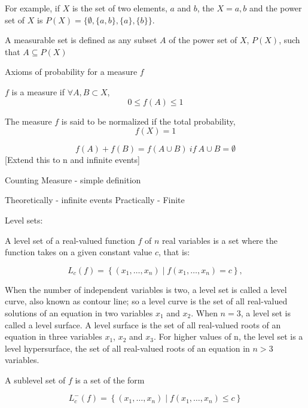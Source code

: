 \documentclass[12pt]{article} %
\theoremstyle{plain}
\begin{document}
	For example, if $X$ is the set of two elements, $a$ and $b$, the $X={a,b}$ and the power set of $X$ is $P(X)=\{\emptyset,\{a,b\},\{a\},\{b\}\}$. 
	
	A measurable set is defined as any subset $A$ of the power set of $X$, $P(X)$, such that $A \subseteq P(X)$
	
	Axioms of probability for a measure $f$
	
	$\mathit{f}$ is a measure if $\forall A,B \subset X$, 
	\begin{equation}
		0 \leq \mathit{f}(A) \leq 1
	\end{equation}
	
	The measure $\mathit{f}$ is said to be normalized if the total probability,
	\begin{equation}
		\mathit{f}(X) = 1
	\end{equation}
	
	\begin{equation}
		\mathit{f}(A) + \mathit{f}(B) = \mathit{f}(A \cup B) \ if \ A \cup	 B = \emptyset
	\end{equation}	
	[Extend this to n and infinite events]
	
	Counting Measure - simple definition
	
	Theoretically - infinite events 
	Practically - Finite
	
	Level sets:
	
	A level set of a real-valued function $f$ of $n$ real variables is a set where the function takes on a given constant value $c$, that is:
	
	\begin{equation}
		L_{c}(f)=\left\{(x_{1},\ldots ,x_{n})\mid f(x_{1},\ldots ,x_{n})=c\right\},
	\end{equation}

	When the number of independent variables is two, a level set is called a level curve, also known as contour line; so a level curve is the set of all real-valued solutions of an equation in two variables $x_1$ and $x_2$. When $n = 3$, a level set is called a level surface. A level surface is the set of all real-valued roots of an equation in three variables $x_1$, $x_2$ and $x_3$. For higher values of n, the level set is a level hypersurface, the set of all real-valued roots of an equation in $n > 3$ variables.
	
	A sublevel set of $f$ is a set of the form
	
	\begin{equation}
		 L_{c}^{-}(f)=\left\{(x_{1},\dots ,x_{n})\mid f(x_{1},\dots ,x_{n})\leq c\right\}
	\end{equation}
	
\end{document}
